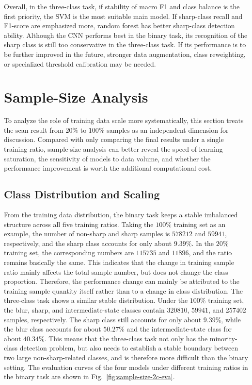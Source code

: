 \par Overall, in the three-class task, if stability of macro F1 and class
balance is the first priority, the SVM is the most suitable main model. If
sharp-class recall and F1-score are emphasized more, random forest has better
sharp-class detection ability. Although the CNN performs best in the binary
task, its recognition of the sharp class is still too conservative in the
three-class task. If its performance is to be further improved in the future,
stronger data augmentation, class reweighting, or specialized threshold
calibration may be needed.

\section{Sample-Size Analysis}
\par To analyze the role of training data scale more systematically, this
section treats the scan result from $20\%$ to $100\%$ samples as an
independent dimension for discussion. Compared with only comparing the final
results under a single training ratio, sample-size analysis can better reveal
the speed of learning saturation, the sensitivity of models to data volume,
and whether the performance improvement is worth the additional computational
cost.

\subsection{Class Distribution and Scaling}
\par From the training data distribution, the binary task keeps a stable
imbalanced structure across all five training ratios. Taking the $100\%$
training set as an example, the number of non-sharp and sharp samples is
$578212$ and $59941$, respectively, and the sharp class accounts for only
about $9.39\%$. In the $20\%$ training set, the corresponding numbers are
$115735$ and $11896$, and the ratio remains basically the same. This indicates
that the change in training sample ratio mainly affects the total sample
number, but does not change the class proportion. Therefore, the performance
change can mainly be attributed to the training sample quantity itself rather
than to a change in class distribution. The three-class task shows a similar
stable distribution. Under the $100\%$ training set, the blur, sharp, and
intermediate-state classes contain $320810$, $59941$, and $257402$ samples,
respectively. The sharp class still accounts for only about $9.39\%$, while
the blur class accounts for about $50.27\%$ and the intermediate-state class
for about $40.34\%$. This means that the three-class task not only has the
minority-class detection problem, but also needs to establish a stable boundary
between two large non-sharp-related classes, and is therefore more difficult
than the binary setting. The evaluation curves of the four models under
different training ratios in the binary task are shown in
Fig.~\ref{fig:sample-size-2c-eva}.

